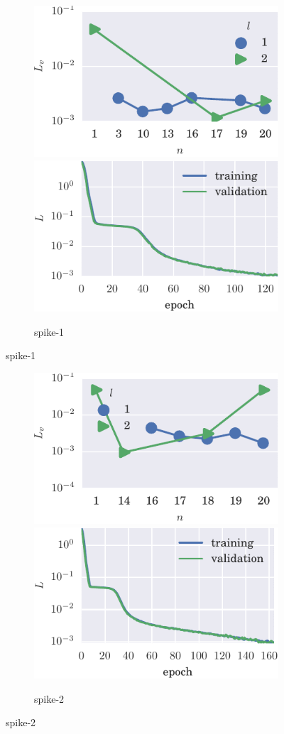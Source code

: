 \begin{figure}[!hp]
    \centering %
  
  \begin{subfigure}[t]{\textwidth} %
        \includegraphics[width=.5\textwidth]{figs/bo_spikelv.pdf}
        \includegraphics[width=.5\textwidth]{figs/trn_spikelv.pdf}
        \caption{spike-1}
    \end{subfigure}%

\end{figure}
\begin{figure}[!hp]
\ContinuedFloat

  \begin{subfigure}[t]{\textwidth}
        \includegraphics[width=.5\textwidth]{figs/bo_spikereg.pdf}
        \includegraphics[width=.5\textwidth]{figs/trn_spikereg.pdf}
        \caption{spike-2}
    \end{subfigure}%

\end{figure}
